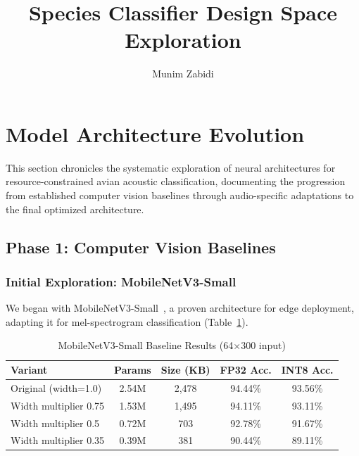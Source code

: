 \documentclass[10pt,a4paper,twoside]{article}
\title{Species Classifier Design Space Exploration}
\author{Munim Zabidi}
\begin{document}
	\maketitle

\section{Model Architecture Evolution}
\label{sec:evolution}

This section chronicles the systematic exploration of neural architectures for resource-constrained avian acoustic classification, documenting the progression from established computer vision baselines through audio-specific adaptations to the final optimized architecture.

\subsection{Phase 1: Computer Vision Baselines}
\label{sec:phase1}

\subsubsection{Initial Exploration: MobileNetV3-Small}

We began with MobileNetV3-Small~\cite{howard2019searching}, a proven architecture for edge deployment, adapting it for mel-spectrogram classification (Table~\ref{tab:mobilenet_baseline}).

\begin{table}[h]
	\centering
	\caption{MobileNetV3-Small Baseline Results (64$\times$300 input)}
	\label{tab:mobilenet_baseline}
	\begin{tabular}{lcccc}
		\toprule
		\textbf{Variant} & \textbf{Params} & \textbf{Size (KB)} & \textbf{FP32 Acc.} & \textbf{INT8 Acc.} \\
		\midrule
		Original (width=1.0) & 2.54M & 2,478 & 94.44\% & 93.56\% \\
		Width multiplier 0.75 & 1.53M & 1,495 & 94.11\% & 93.11\% \\
		Width multiplier 0.5 & 0.72M & 703 & 92.78\% & 91.67\% \\
		Width multiplier 0.35 & 0.39M & 381 & 90.44\% & 89.11\% \\
		\bottomrule
	\end{tabular}
\end{table}
\end{document}
